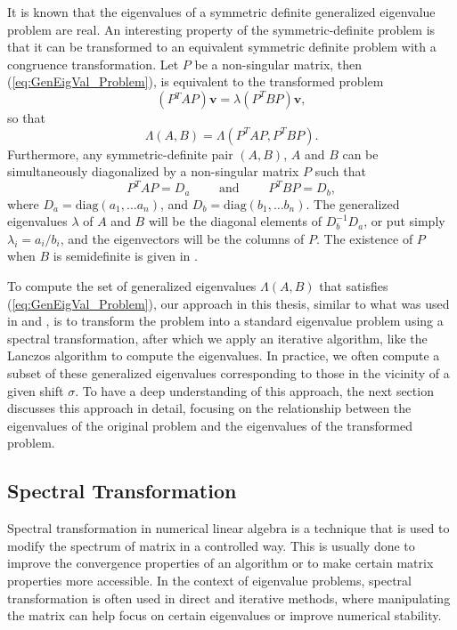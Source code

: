 It is known that the eigenvalues of a symmetric definite generalized eigenvalue problem are real. An interesting property of the symmetric-definite problem is that it can be transformed to an equivalent symmetric definite problem with a congruence transformation. Let $P$ be a non-singular matrix, then (\ref{eq:GenEigVal_Problem}), is equivalent to the transformed problem
\begin{equation}\label{eq:CongruenceTransGenEigVal}
	(P{^T}AP) \mathbf{v}= \lambda (P^{T}BP) \mathbf{v},
\end{equation}
so that
\begin{equation}\label{eq:EquivalenceOfEigVals}
	\Lambda(A, B) = \Lambda(P^{T}AP, P^{T}BP).
\end{equation}
Furthermore, any symmetric-definite pair $(A, B)$, $A$ and $B$ can be simultaneously diagonalized by a non-singular matrix $P$ such that
\begin{equation}\label{eq:SimultaneousDiag}
	P^{T}AP = D_a \qquad \text{ and } \qquad P^TBP = D_b,
\end{equation}
where $D_a = \text{diag}(a_1, \ldots a_n) $, and $D_b = \text{diag}(b_1, \ldots b_n) $. The generalized eigenvalues $\lambda$ of $A$ and $B$ will be the diagonal elements of $D^{-1}_bD_a$, or put simply $\lambda_i = a_i/b_i$, and the eigenvectors will be the columns of $P$. The existence of $P$ when $B$ is semidefinite is given in \cite[p.~498]{doi:10.1137/1.9781421407944}.

To compute the set of generalized eigenvalues $\Lambda(A, B)$ that satisfies (\ref{eq:GenEigVal_Problem}), our approach in this thesis, similar to what was used in \cite{stewart2024spectraltransformationdensesymmetric} and \cite{Ericsson1980TheST}, is to transform the problem into a standard eigenvalue problem using a spectral transformation, after which we apply an iterative algorithm, like the Lanczos algorithm to compute the eigenvalues. In practice, we often compute a subset of these generalized eigenvalues corresponding to those in the vicinity of a given shift $\sigma$. To have a deep understanding of this approach, the next section discusses this approach in detail, focusing on the relationship between the eigenvalues of the original problem and the eigenvalues of the transformed problem.

\subsection{Spectral Transformation}\label{sec:SpectralTransformationDefinition}
Spectral transformation in numerical linear algebra is a technique that is used to modify the spectrum of matrix in a controlled way. This is usually done to improve the convergence properties of an algorithm or to make certain matrix properties more accessible. In the context of eigenvalue problems, spectral transformation is often used in direct and iterative methods, where manipulating the matrix can help focus on certain eigenvalues or improve numerical stability.

